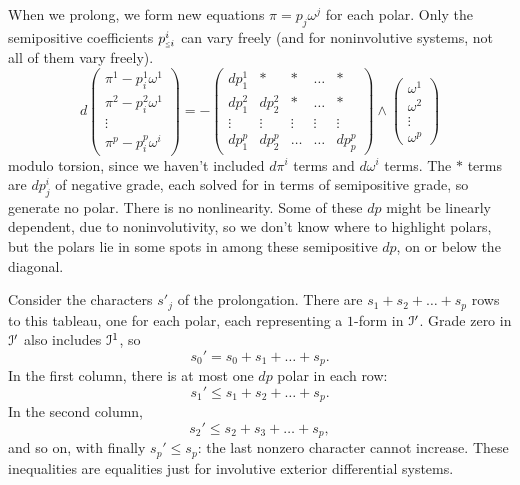 %
When we prolong, we form new equations \(\pi=p_j\omega^j\) for each polar.
Only the semipositive coefficients \(p^i_{\legr{i}}\) can vary freely (and for noninvolutive systems, not all of them vary freely).
\[
d
\begin{pmatrix}
\pi^1-p^1_i\omega^1\\
\pi^2-p^2_i\omega^1\\
\vdots\\
\pi^p-p^p_i\omega^i
\end{pmatrix}
=
-
\begin{pmatrix}
dp^1_1 & *      & *      & \dots  & * \\
dp^2_1 & dp^2_2 & *      & \dots  & * \\
\vdots & \vdots & \vdots & \vdots & \vdots \\
dp^p_1 & dp^p_2 & \dots  & \dots  & dp^p_p
\end{pmatrix}
\wedge
\begin{pmatrix}
\omega^1 \\
\omega^2\\
\vdots\\
\omega^p
\end{pmatrix}
\]
modulo torsion, since we haven't included \(d\pi^i\) terms and \(d\omega^i\) terms.
The \(*\) terms are \(dp^i_j\) of negative grade, each solved for in terms of semipositive grade, so generate no polar.
There is no nonlinearity.
Some of these \(dp\) might be linearly dependent, due to noninvolutivity, so we don't know where to highlight polars, but the polars lie in some spots in among these semipositive \(dp\), on or below the diagonal.

Consider the characters \(s'_j\) of the prolongation.
There are \(s_1+s_2+\dots+s_p\) rows to this tableau, one for each polar, each representing a \(1\)-form in \(\mathcal{I}'\).
Grade zero in \(\mathcal{I}'\) also includes \(\mathcal{I}^1\), so
\[
s_0'=s_0+s_1+\dots+s_p.
\]
In the first column, there is at most one \(dp\) polar in each row:
\[
s_1'\le s_1+s_2+\dots+s_p.
\]
In the second column, 
\[
s_2'\le s_2+s_3+\dots+s_p,
\]
and so on, with finally \(s_p'\le s_p\): the last nonzero character cannot increase.
These inequalities are equalities just for involutive exterior differential systems.
